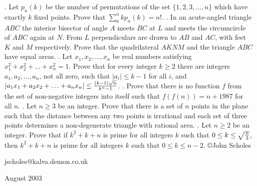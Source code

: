 \nopagenumbers
{}
\vskip 25pt
. Let $p_n(k)$ be the number of permutations of the set $\{1,2,3,\ldots,n\}$ which have exactly $k$ fixed points. Prove that $\sum_0^nk p_n(k)=n!$.
\vskip 12pt
. In an acute-angled triangle $ABC$ the interior bisector of angle $A$ meets $BC$ at $L$ and meets the circumcircle of $ABC$ again at $N$. From $L$ perpendiculars are drawn to $AB$ and $AC$, with feet $K$ and $M$ respectively. Prove that the quadrilateral $AKNM$ and the triangle $ABC$ have equal areas.
\vskip 12pt
. Let $x_1,x_2,\ldots,x_n$ be real numbers satisfying $x_1^2+x_2^2+\ldots+x_n^2=1$. Prove that for every integer $k\ge2$ there are integers $a_1,a_2,\ldots,a_n$, not all zero, such that $|a_i|\le k-1$ for all $i$, and $|a_1x_1+a_2x_2+\ldots+a_nx_n|\le{(k-1)\sqrt n\over k^n-1}$.
\vskip 12pt
. Prove that there is no function $f$ from the set of non-negative integers into itself such that $f(f(n))=n+1987$ for all $n$.
\vskip 12pt
. Let $n\ge3$ be an integer. Prove that there is a set of $n$ points in the plane such that the distance between any two points is irrational and each set of three points determines a non-degenerate triangle with rational area. 
\vskip 12pt
. Let $n\ge2$ be an integer. Prove that if $k^2+k+n$ is prime for all integers $k$ such that $0\le k\le\sqrt{n\over3}$, then $k^2+k+n$ is prime for all integers $k$ such that $0\le k\le n-2$.
\vskip 20pt
\noindent \copyright John Scholes

\noindent jscholes@kalva.demon.co.uk

 August 2003

\bye
